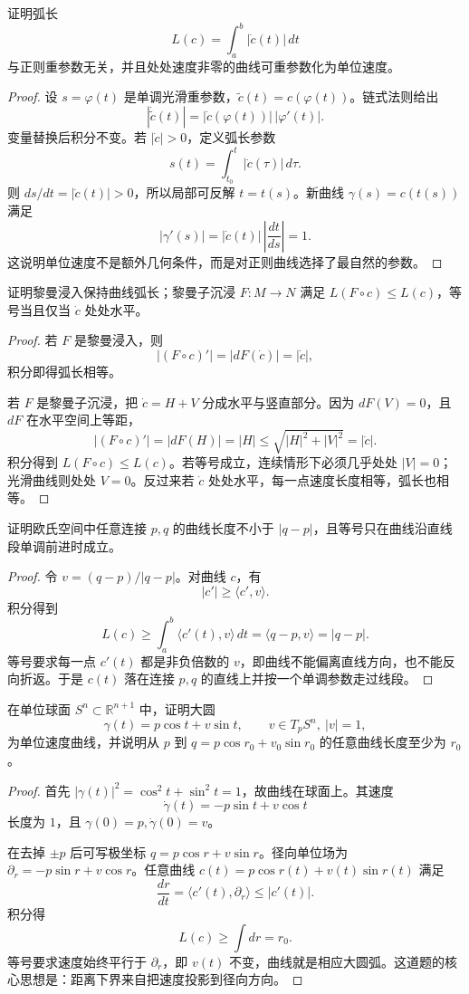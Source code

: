 \documentclass[11pt,a4paper,openany]{ctexbook}
\numberwithin{equation}{chapter}
\begin{document}
\begin{problem}
证明弧长
\[
L(c)=\int_a^b|\dot c(t)|\,dt
\]
与正则重参数无关，并且处处速度非零的曲线可重参数化为单位速度。
\end{problem}
\begin{proof}
设 \(s=\varphi(t)\) 是单调光滑重参数，\(\tilde c(t)=c(\varphi(t))\)。链式法则给出
\[
|\dot{\tilde c}(t)|=|\dot c(\varphi(t))|\,|\varphi'(t)|.
\]
变量替换后积分不变。若 \(|\dot c|>0\)，定义弧长参数
\[
s(t)=\int_{t_0}^t|\dot c(\tau)|\,d\tau.
\]
则 \(ds/dt=|\dot c(t)|>0\)，所以局部可反解 \(t=t(s)\)。新曲线 \(\gamma(s)=c(t(s))\) 满足
\[
|\gamma'(s)|=|\dot c(t)|\,\left|\frac{dt}{ds}\right|=1.
\]
这说明单位速度不是额外几何条件，而是对正则曲线选择了最自然的参数。
\end{proof}

\begin{problem}
证明黎曼浸入保持曲线弧长；黎曼子沉浸 \(F\colon M\to N\) 满足 \(L(F\circ c)\le L(c)\)，等号当且仅当 \(\dot c\) 处处水平。
\end{problem}
\begin{proof}
若 \(F\) 是黎曼浸入，则
\[
|(F\circ c)'|=|dF(\dot c)|=|\dot c|,
\]
积分即得弧长相等。

若 \(F\) 是黎曼子沉浸，把 \(\dot c=H+V\) 分成水平与竖直部分。因为 \(dF(V)=0\)，且 \(dF\) 在水平空间上等距，
\[
|(F\circ c)'|=|dF(H)|=|H|\le \sqrt{|H|^2+|V|^2}=|\dot c|.
\]
积分得到 \(L(F\circ c)\le L(c)\)。若等号成立，连续情形下必须几乎处处 \(|V|=0\)；光滑曲线则处处 \(V=0\)。反过来若 \(\dot c\) 处处水平，每一点速度长度相等，弧长也相等。
\end{proof}

\begin{problem}
证明欧氏空间中任意连接 \(p,q\) 的曲线长度不小于 \(|q-p|\)，且等号只在曲线沿直线段单调前进时成立。
\end{problem}
\begin{proof}
令 \(v=(q-p)/|q-p|\)。对曲线 \(c\)，有
\[
|c'|\ge \langle c',v\rangle.
\]
积分得到
\[
L(c)\ge \int_a^b\langle c'(t),v\rangle\,dt
=\langle q-p,v\rangle=|q-p|.
\]
等号要求每一点 \(c'(t)\) 都是非负倍数的 \(v\)，即曲线不能偏离直线方向，也不能反向折返。于是 \(c(t)\) 落在连接 \(p,q\) 的直线上并按一个单调参数走过线段。
\end{proof}

\begin{problem}
在单位球面 \(S^n\subset\mathbb R^{n+1}\) 中，证明大圆
\[
\gamma(t)=p\cos t+v\sin t,\qquad v\in T_pS^n,\ |v|=1,
\]
为单位速度曲线，并说明从 \(p\) 到 \(q=p\cos r_0+v_0\sin r_0\) 的任意曲线长度至少为 \(r_0\)。
\end{problem}
\begin{proof}
首先 \(|\gamma(t)|^2=\cos^2t+\sin^2t=1\)，故曲线在球面上。其速度
\[
\dot\gamma(t)=-p\sin t+v\cos t
\]
长度为 \(1\)，且 \(\gamma(0)=p,\dot\gamma(0)=v\)。

在去掉 \(\pm p\) 后可写极坐标 \(q=p\cos r+v\sin r\)。径向单位场为 \(\partial_r=-p\sin r+v\cos r\)。任意曲线 \(c(t)=p\cos r(t)+v(t)\sin r(t)\) 满足
\[
\frac{dr}{dt}=\langle c'(t),\partial_r\rangle\le |c'(t)|.
\]
积分得
\[
L(c)\ge \int dr=r_0.
\]
等号要求速度始终平行于 \(\partial_r\)，即 \(v(t)\) 不变，曲线就是相应大圆弧。这道题的核心思想是：距离下界来自把速度投影到径向方向。
\end{proof}
\end{document}
